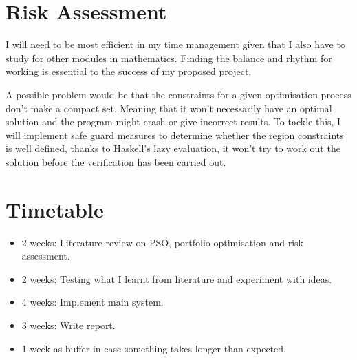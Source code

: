\documentclass[a4paper,12pt]{article}
\begin{document}
\section*{Risk Assessment}
I will need to be most efficient in my time management given that I also have to study for other modules in mathematics. Finding the balance and rhythm for working is essential to the success of my proposed project.

A possible problem would be that the constraints for a given optimisation process don't make a compact set. Meaning that it won't necessarily have an optimal solution and the program might crash or give incorrect results. To tackle this, I will implement safe guard measures to determine whether the region constraints is well defined, thanks to Haskell's lazy evaluation, it won't try to work out the solution before the verification has been carried out. 


\section*{Timetable}
\begin{itemize}
  \item 2 weeks: Literature review on PSO, portfolio optimisation and risk assessment. 
  \item 2 weeks: Testing what I learnt from literature and experiment with ideas.
  \item 4 weeks: Implement main system.
  \item 3 weeks: Write report.
  \item 1 week as buffer in case something takes longer than expected.
\end{itemize}




\end{document}
